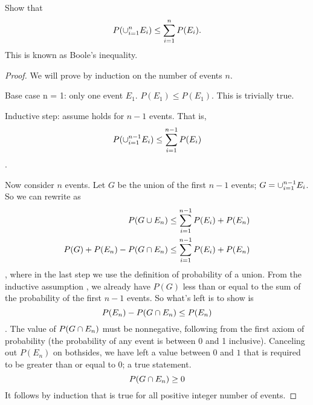 \documentclass{article}
\begin{document}
    \makemytitle

    \nextproblem

    \begin{problem}
        Show that
        \begin{equation}
            P(\cup^n_{i=1} E_i) \leq \sum_{i=1}^n P(E_i).
            \label{eq:boole}
        \end{equation}
        This is known as Boole's inequality.
    \end{problem}

    \begin{solution}
        \begin{proof}
            We will prove  by induction on the number of events $n$.

            Base case n = 1: only one event $E_1$.
            $P(E_1) \leq P(E_1)$.
            This is trivially true.

            Inductive step: assume  holds for $n - 1$ events. That is,
            \begin{equation}
                P(\cup^{n-1}_{i=1} E_i) \leq \sum_{i=1}^{n-1} P(E_i)
                \label{eq:inductive}
            \end{equation}.

            Now consider $n$ events. Let $G$ be the union of the first $n - 1$ events; 
            $G = \cup^{n-1}_{i=1} E_i$.
            So we can rewrite  as 
            \begin{align*}
                P(G \cup E_n) &\leq \sum_{i=1}^{n-1} P(E_i) + P(E_n) \\
                P(G) + P(E_n) - P(G \cap E_n) &\leq \sum_{i=1}^{n-1} P(E_i) + P(E_n)
            \end{align*}
            , where in the last step we use the definition of probability of a union. From the inductive assumption , we already have $P(G)$ less than or equal to the sum of the probability of the first $n - 1$ events. So what's left is to show is 
            \begin{equation*}
                P(E_n) - P(G \cap E_n) \leq P(E_n)
            \end{equation*}
            . The value of $P(G \cap E_n)$ must be nonnegative, following from the first axiom of probability (the probability of any event is between 0 and 1 inclusive). Canceling out $P(E_n)$ on bothsides, we have left a value between 0 and $1$ that is required to be greater than or equal to 0; a true statement.
            \begin{equation*}
                P(G \cap E_n) \geq 0 
            \end{equation*}
            It follows by induction that  is true for all positive integer number of events.
        \end{proof}
    \end{solution}
\end{document}
